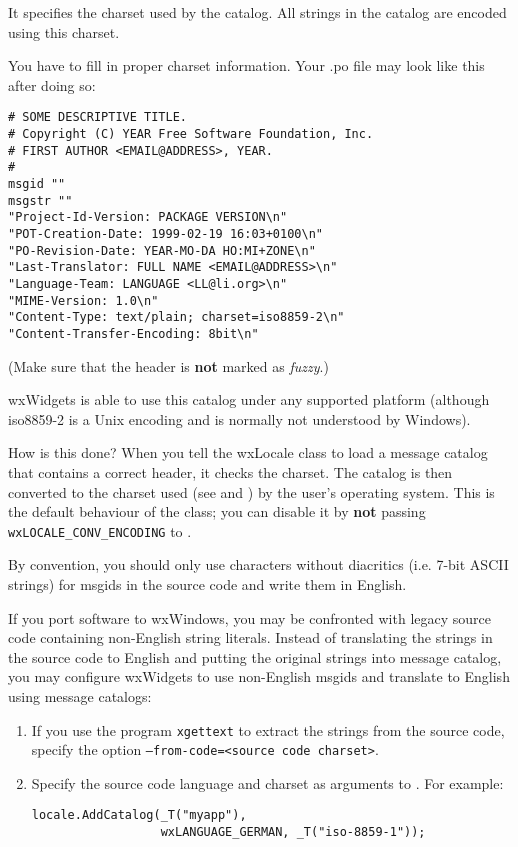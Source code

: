 It specifies the charset used by the catalog. All strings in the catalog
are encoded using this charset.

You have to fill in proper charset information. Your .po file may look like this
after doing so: 

\begin{verbatim}
# SOME DESCRIPTIVE TITLE.
# Copyright (C) YEAR Free Software Foundation, Inc.
# FIRST AUTHOR <EMAIL@ADDRESS>, YEAR.
#
msgid ""
msgstr ""
"Project-Id-Version: PACKAGE VERSION\n"
"POT-Creation-Date: 1999-02-19 16:03+0100\n"
"PO-Revision-Date: YEAR-MO-DA HO:MI+ZONE\n"
"Last-Translator: FULL NAME <EMAIL@ADDRESS>\n"
"Language-Team: LANGUAGE <LL@li.org>\n"
"MIME-Version: 1.0\n"
"Content-Type: text/plain; charset=iso8859-2\n"
"Content-Transfer-Encoding: 8bit\n"
\end{verbatim}

(Make sure that the header is {\bf not} marked as {\it fuzzy}.)

wxWidgets is able to use this catalog under any supported platform
(although iso8859-2 is a Unix encoding and is normally not understood by
Windows).

How is this done? When you tell the wxLocale class to load a message catalog that
contains a correct header, it checks the charset. The catalog is then converted
to the charset used (see
 and
) by
the user's operating system. This is the default behaviour of the
 class; you can disable it by {\bf not} passing
{\tt wxLOCALE\_CONV\_ENCODING} to .


By convention, you should only use characters without diacritics (i.e. 7-bit
ASCII strings) for msgids in the source code and write them in English.

If you port software to wxWindows, you may be confronted with legacy source
code containing non-English string literals. Instead of translating the strings
in the source code to English and putting the original strings into message
catalog, you may configure wxWidgets to use non-English msgids and translate to
English using message catalogs:

\begin{enumerate}
\item{If you use the program {\tt xgettext} to extract the strings from
the source code, specify the option {\tt --from-code=<source code charset>}.}
\item{Specify the source code language and charset as arguments to
. For example:
\begin{verbatim}
locale.AddCatalog(_T("myapp"),
                  wxLANGUAGE_GERMAN, _T("iso-8859-1"));
\end{verbatim}
}
\end{enumerate}

